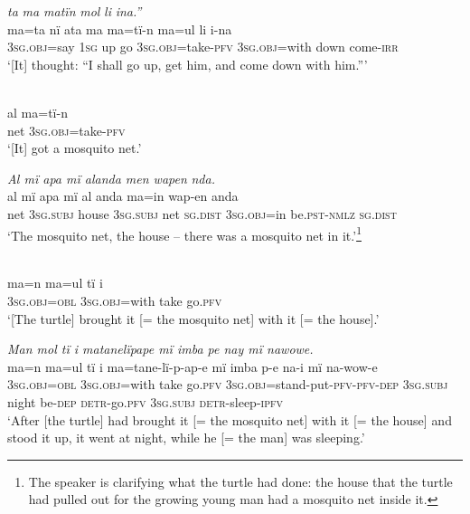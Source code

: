 \textit{t}{\textit{a}} \textit{ma matï}{\textit{n}} \textit{m}{\textit{o}}\textit{l} {\textit{l}}\textit{i} {\textit{i}}\textit{na.”}\\
\gll ma=ta      nï    at{a} ma  ma{=}tï{{}-n} m{a=u}l       {l}i {i-}na\\
3\textsc{sg.obj}=say  1\textsc{sg}  up  go  3\textsc{sg.obj}=take-\textsc{pfv}  3\textsc{sg.obj}=with  down come-\textsc{irr}\\
\glt ‘[It] thought: “I shall go up, get him, and come down with him.”’

\\
\gll al  ma{=}tï{{}-}n\\
net  3\textsc{sg.obj}=take-\textsc{pfv}\\
\glt ‘{[It]} got a mosquito {net.}’

\ex \textit{Al mï apa mï alanda men wape}{\textit{n}} \textit{nda.}\\
\gll al  mï      apa    mï      al  anda    m{a=i}n wap{{}-}e{n} {a}nda\\
net  3\textsc{sg.subj}  house  3\textsc{sg.subj}  net  \textsc{sg.dist}  3\textsc{sg.obj}=in  be.\textsc{pst-nmlz} {\scshape sg.dist}\\
\glt ‘The mosquito {net}, the house -- {there was a mosquito net in it.}’\footnote{The speaker is clarifying what the turtle had done: the house that the turtle had pulled out for the growing young man had a mosquito net inside it.}

\\
\gll ma{=}n      m{a=u}l       tï    i\\
3\textsc{sg.obj=obl}  \textsc{3sg.obj=}with  take  go.\textsc{pfv}\\
\glt ‘{[The turtle]} brought it {[= the mosquito net]} with it {[= the house]}.’

\ex \textit{Man mol tï i matan}{\textit{e}}\textit{lïpape mï imba pe nay mï nawowe.}\\
\gll ma{=}n      m{a=u}l      tï    i    ma{=}tan{e-}l{ï-}p{{}-}ap{{}-}e mï      imba{} p{{}-}e    na{{}-i} mï      n{a-}wow{}-e\\
3\textsc{sg.obj=obl}  \textsc{3sg.obj=}with  take  go.\textsc{pfv}  \textsc{3sg.obj}=stand-put-\textsc{pfv-pfv-dep} 3\textsc{sg.subj}  night  be-\textsc{dep}  \textsc{detr-}go.\textsc{pfv}  3\textsc{sg.subj}  \textsc{detr-}sleep-\textsc{ipfv}\\
\glt ‘{After [t}he turtle] {had} brought it [= the mosquito {net]} with it [= the house] {and} stood it up, it went at night, while he [= the man] was sleeping.’

